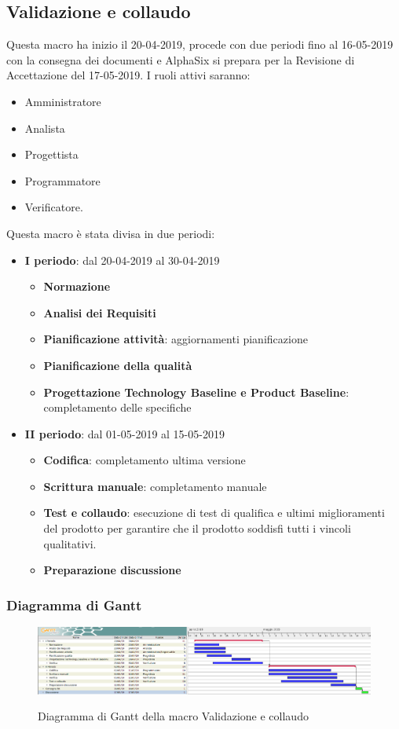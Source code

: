        \subsection{Validazione e collaudo}
        Questa macro ha inizio il 20-04-2019, procede con due periodi fino al 16-05-2019 con la consegna dei documenti e AlphaSix si
        prepara per la Revisione di Accettazione del 17-05-2019. I ruoli attivi saranno: 
        \begin{itemize}
            \item Amministratore
            \item Analista
            \item Progettista
            \item Programmatore
            \item Verificatore.
        \end{itemize}
        Questa macro è stata divisa in due periodi:
		\begin{itemize}
			\item \textbf{I periodo}: dal 20-04-2019 al 30-04-2019
			\begin{itemize}
    	        \item \textbf{Normazione}
    	        \item \textbf{Analisi dei Requisiti}
    	        \item \textbf{Pianificazione attività}: aggiornamenti pianificazione
    	        \item \textbf{Pianificazione della qualità}
    	        \item \textbf{Progettazione Technology Baseline e Product Baseline}: completamento delle specifiche
        	\end{itemize}
			\item \textbf{II periodo}: dal 01-05-2019 al 15-05-2019
			\begin{itemize}
    	        \item \textbf{Codifica}: completamento ultima versione
    	        \item \textbf{Scrittura manuale}: completamento manuale
    	        \item \textbf{Test e collaudo}: esecuzione di test di qualifica e ultimi miglioramenti del prodotto per
    	        garantire che il prodotto soddisfi tutti i vincoli qualitativi.
    	        \item \textbf{Preparazione discussione}
        	\end{itemize}
		\end{itemize}
        
        
            \subsubsection{Diagramma di Gantt}

				\begin{figure}[H]
					\centering
					\includegraphics{img/Validazione_e_collaudo}\\
					\caption{Diagramma di Gantt della macro Validazione e collaudo}
				\end{figure}
